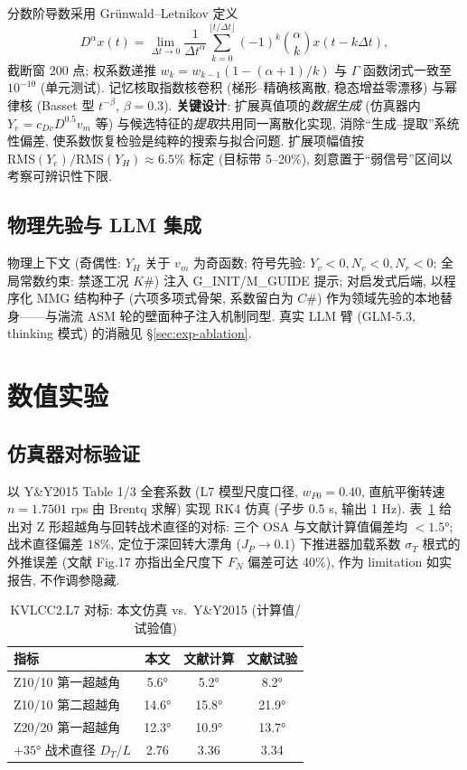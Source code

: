 \documentclass[12pt,a4paper]{ctexart}
\begin{document}
分数阶导数采用 Grünwald--Letnikov 定义
\begin{equation}
D^\alpha x(t) = \lim_{\Delta t\to 0}\frac{1}{\Delta t^\alpha}\sum_{k=0}^{\lfloor t/\Delta t\rfloor} (-1)^k\binom{\alpha}{k}x(t-k\Delta t),
\label{eq:gl}
\end{equation}
截断窗 200 点; 权系数递推 $w_k = w_{k-1}(1-(\alpha+1)/k)$ 与 $\Gamma$ 函数闭式一致至 $10^{-10}$ (单元测试). 记忆核取指数核卷积 (梯形--精确核离散, 稳态增益零漂移) 与幂律核 (Basset 型 $t^{-\beta}$, $\beta=0.3$). \textbf{关键设计}: 扩展真值项的\textit{数据生成} (仿真器内 $Y_e = c_{Dv}D^{0.5}v_m$ 等) 与候选特征的\textit{提取}共用同一离散化实现, 消除``生成--提取''系统性偏差, 使系数恢复检验是纯粹的搜索与拟合问题. 扩展项幅值按 $\mathrm{RMS}(Y_e)/\mathrm{RMS}(Y_H)\approx 6.5\%$ 标定 (目标带 5--20\%), 刻意置于``弱信号''区间以考察可辨识性下限.

\subsection{物理先验与 LLM 集成}
\label{sec:prior}

物理上下文 (奇偶性: $Y_H$ 关于 $v_m$ 为奇函数; 符号先验: $Y_v<0, N_v<0, N_r<0$; 全局常数约束: 禁逐工况 $K\#$) 注入 G\_INIT/M\_GUIDE 提示; 对启发式后端, 以程序化 MMG 结构种子 (六项多项式骨架, 系数留白为 $C\#$) 作为领域先验的本地替身——与湍流 ASM 轮的壁面种子注入机制同型. 真实 LLM 臂 (GLM-5.3, thinking 模式) 的消融见 §\ref{sec:exp-ablation}.

\section{数值实验}
\label{sec:exp}

\subsection{仿真器对标验证}
\label{sec:exp-val}

以 Y\&Y2015 Table 1/3 全套系数 (L7 模型尺度口径, $w_{P0}=0.40$, 直航平衡转速 $n=1.7501$ rps 由 Brentq 求解) 实现 RK4 仿真 (子步 0.5 s, 输出 1 Hz). 表~\ref{tab:benchmark} 给出对 Z 形超越角与回转战术直径的对标: 三个 OSA 与文献计算值偏差均 $<1.5°$; 战术直径偏差 $18\%$, 定位于深回转大漂角 ($J_P\to 0.1$) 下推进器加载系数 $\sigma_T$ 根式的外推误差 (文献 Fig.17 亦指出全尺度下 $F_N$ 偏差可达 40\%), 作为 limitation 如实报告, 不作调参隐藏.

\begin{table}[htbp]
\centering\small
\caption{KVLCC2.L7 对标: 本文仿真 vs.\ Y\&Y2015 (计算值/试验值)}
\label{tab:benchmark}
\begin{tabular}{lccc}
\toprule
指标 & 本文 & 文献计算 & 文献试验 \\
\midrule
Z10/10 第一超越角 & 5.6° & 5.2° & 8.2° \\
Z10/10 第二超越角 & 14.6° & 15.8° & 21.9° \\
Z20/20 第一超越角 & 12.3° & 10.9° & 13.7° \\
$+35°$ 战术直径 $D_T/L$ & 2.76 & 3.36 & 3.34 \\
\bottomrule
\end{tabular}
\end{table}
\end{document}

